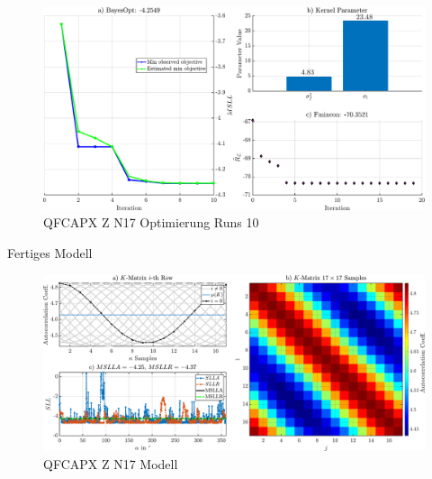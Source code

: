 \begin{figure}[tbph]
	\centering
	\includegraphics[width=\linewidth]{appendix/images/8-Ergebnisse-Experimente/QFCAPX-Z-N17-Opt}
	\caption[QFCAPX Z N17 Optimierung Runs 10]{QFCAPX Z N17 Optimierung Runs 10}
	\label{fig:qfcapx-z-n17-opt}
\end{figure}



Fertiges Modell


\begin{figure}[tbph]
	\centering
	\includegraphics[width=\linewidth]{appendix/images/8-Ergebnisse-Experimente/QFCAPX-Z-N17-Model}
	\caption[QFCAPX Z N17 Modell]{QFCAPX Z N17 Modell}
	\label{fig:qfcapx-z-n17-model}
\end{figure}

